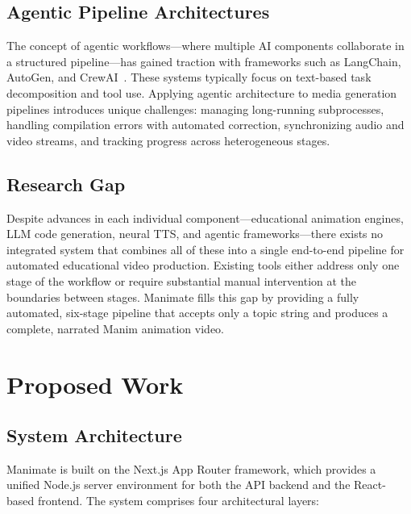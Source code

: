 \documentclass[12pt,a4paper,twoside,openright]{report}
\begin{document}
\section{Agentic Pipeline Architectures}

The concept of agentic workflows---where multiple AI components collaborate in a structured pipeline---has gained traction with frameworks such as LangChain, AutoGen, and CrewAI~\cite{wu2023autogen}. These systems typically focus on text-based task decomposition and tool use. Applying agentic architecture to media generation pipelines introduces unique challenges: managing long-running subprocesses, handling compilation errors with automated correction, synchronizing audio and video streams, and tracking progress across heterogeneous stages.

\section{Research Gap}

Despite advances in each individual component---educational animation engines, LLM code generation, neural TTS, and agentic frameworks---there exists no integrated system that combines all of these into a single end-to-end pipeline for automated educational video production. Existing tools either address only one stage of the workflow or require substantial manual intervention at the boundaries between stages. Manimate fills this gap by providing a fully automated, six-stage pipeline that accepts only a topic string and produces a complete, narrated Manim animation video.

\cleardoublepage


\chapter{Proposed Work}

\section{System Architecture}

Manimate is built on the Next.js App Router framework, which provides a unified Node.js server environment for both the API backend and the React-based frontend. The system comprises four architectural layers:
\end{document}
